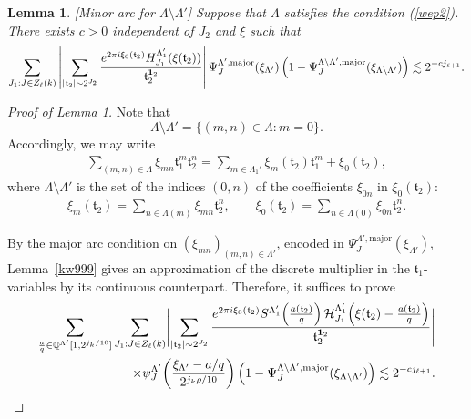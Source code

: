 \documentclass[11 pt,letterpaper]{amsart}
\theoremstyle{plain}
\newtheorem{lemma}{Lemma}\numberwithin{lemma}{section}
\theoremstyle{definition}
\theoremstyle{remark} \theoremstyle{exam} \theoremstyle{ob}
\numberwithin{equation}{section}
\begin{document}
\begin{lemma}\label{lee44b9}
[Minor arc for $\Lambda\setminus \Lambda'$] Suppose that $\Lambda$ satisfies   the  condition (\ref{wep2}). There exists $c>0$ independent of $J_2$ and  $\xi$ such that
\begin{equation*}
  \sum_{J_1:J\in Z_{\ell}(k)}   \left| \sum_{|\mathfrak{t}_2|\sim 2^{J_2} }   \frac{e^{2\pi i \xi_0(\mathfrak{t}_2)}H^{\Lambda'_{1}}_{J_{1}}(\xi(\mathfrak{t}_2))}{\mathfrak{t}_2^{{\bf 1}_2} }\right|  \Psi_{J}^{\Lambda',\rm{major}}(\xi_{\Lambda'})
\left(1-\Psi_J^{\Lambda\setminus \Lambda',\rm{major}}(\xi_{\Lambda\setminus\Lambda'})\right) \lesssim 2^{-cj_{\ell+1}}.
\end{equation*}
\end{lemma}
\begin{proof}[Proof of Lemma \ref{lee44b9}] 
Note that
\[
\Lambda\setminus \Lambda'
=
\{(m,n)\in \Lambda : m=0\}.
\]
Accordingly, we may write
\begin{align*}
\sum_{(m,n)\in\Lambda}\xi_{mn}\mathfrak{t}_1^m\mathfrak{t}_2^n
=
\sum_{m\in \Lambda_1'} \xi_m(\mathfrak{t}_2)\mathfrak{t}_1^m
+\xi_0(\mathfrak{t}_2),
\end{align*}
where $\Lambda\setminus \Lambda'$ is the set of the indices $(0,n)$ of the coefficients $\xi_{0n}$ in $\xi_0(\mathfrak{t}_2)$:
\begin{align}\label{0011}
\xi_m(\mathfrak{t}_2)
=
\sum_{n\in \Lambda(m)} \xi_{mn}\mathfrak{t}_2^n,
\qquad
\xi_0(\mathfrak{t}_2)
=
\sum_{n\in \Lambda(0)} \xi_{0n}\mathfrak{t}_2^n.
\end{align}

By the major arc condition on $(\xi_{mn})_{(m,n)\in\Lambda'}$, encoded in
$\Psi_{J}^{\Lambda',\mathrm{major}}(\xi_{\Lambda'})$, Lemma~\ref{kw999} gives an approximation of the discrete multiplier in the $\mathfrak{t}_1$-variables by its continuous counterpart. Therefore, it suffices to prove
\begin{align}\label{t8}
\sum_{\frac{a}{q}\in \mathbb{Q}^{\Lambda'}[1,2^{j_k/10}]}
\sum_{J_1:J\in Z_{\ell}(k)}
\Biggl|
\sum_{|\mathfrak{t}_2|\sim 2^{J_2}}
\frac{
e^{2\pi i \xi_0(\mathfrak{t}_2)}
S^{\Lambda_1'}\!\left(\frac{a(\mathfrak{t}_2)}{q}\right)
\mathcal{H}^{\Lambda_1'}_{J_1}\!\left(\xi(\mathfrak{t}_2)-\frac{a(\mathfrak{t}_2)}{q}\right)
}{
\mathfrak{t}_2^{{\bf 1}_2}
}
\Biggr|
\\
\qquad\qquad\times
\psi_J^{\Lambda'}\!\left(\frac{\xi_{\Lambda'}-a/q}{2^{j_k\rho/10}}\right)
\left(1-\Psi_J^{\Lambda\setminus \Lambda',\mathrm{major}}(\xi_{\Lambda\setminus\Lambda'})\right)
\lesssim 2^{-c j_{\ell+1}}.\notag
\end{align}



\end{proof}
\end{document}
